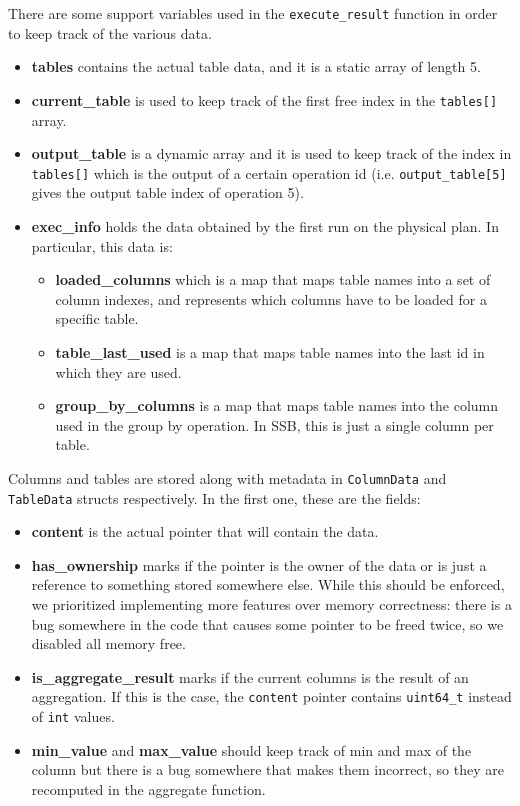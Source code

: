 \documentclass[a4paper, 10pt]{article}
\begin{document}
There are some support variables used in the \texttt{execute\_result} function in order to keep track of the various data.
\begin{itemize}
    \item \textbf{tables} contains the actual table data, and it is a static array of length 5.
    \item \textbf{current\_table} is used to keep track of the first free index in the \texttt{tables[]} array.
    \item \textbf{output\_table} is a dynamic array and it is used to keep track of the index in \texttt{tables[]} which is the output of a certain operation id (i.e. \texttt{output\_table[5]} gives the output table index of operation 5).
    \item \textbf{exec\_info} holds the data obtained by the first run on the physical plan. In particular, this data is:
          \begin{itemize}
              \item \textbf{loaded\_columns} which is a map that maps table names into a set of column indexes, and represents which columns have to be loaded for a specific table.
              \item \textbf{table\_last\_used} is a map that maps table names into the last id in which they are used.
              \item \textbf{group\_by\_columns} is a map that maps table names into the column used in the group by operation. In SSB, this is just a single column per table.
          \end{itemize}
\end{itemize}

Columns and tables are stored along with metadata in \texttt{ColumnData} and \texttt{TableData} structs respectively. In the first one, these are the fields:
\begin{itemize}
    \item \textbf{content} is the actual pointer that will contain the data.
    \item \textbf{has\_ownership} marks if the pointer is the owner of the data or is just a reference to something stored somewhere else. While this should be enforced, we prioritized implementing more features over memory correctness: there is a bug somewhere in the code that causes some pointer to be freed twice, so we disabled all memory free.
    \item \textbf{is\_aggregate\_result} marks if the current columns is the result of an aggregation. If this is the case, the \texttt{content} pointer contains \texttt{uint64\_t} instead of \texttt{int} values.
    \item \textbf{min\_value} and \textbf{max\_value} should keep track of min and max of the column but there is a bug somewhere that makes them incorrect, so they are recomputed in the aggregate function.
\end{itemize}
\end{document}
